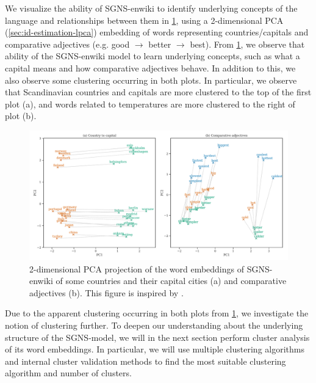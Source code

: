 We visualize the ability of SGNS-enwiki to identify underlying concepts of the language and relationships between them in \cref{fig:sgns-enwiki-word-to-word-relations-pca-2d}, using a 2-dimensional PCA (\cref{sec:id-estimation-lpca}) embedding of words representing countries/capitals and comparative adjectives (e.g. good $\rightarrow$ better $\rightarrow$ best). From \cref{fig:sgns-enwiki-word-to-word-relations-pca-2d}, we observe that ability of the SGNS-enwiki model to learn underlying concepts, such as what a capital means and how comparative adjectives behave. In addition to this, we also observe some clustering occurring in both plots. In particular, we observe that Scandinavian countries and capitals are more clustered to the top of the first plot (a), and words related to temperatures are more clustered to the right of plot (b).
\begin{figure}[H]
   \centering
   \includegraphics[width=\textwidth]{thesis/figures/word-to-word-relationships-pca-2d.pdf}
 \caption{2-dimensional PCA projection of the word embeddings of SGNS-enwiki of some countries and their capital cities (a) and comparative adjectives (b). This figure is inspired by \cite[Figure 2]{mikolov2013b}.}
 \label{fig:sgns-enwiki-word-to-word-relations-pca-2d}
\end{figure}

Due to the apparent clustering occurring in both plots from \cref{fig:sgns-enwiki-word-to-word-relations-pca-2d}, we investigate the notion of clustering further. To deepen our understanding about the underlying structure of the SGNS-model, we will in the next section perform cluster analysis of its word embeddings. In particular, we will use multiple clustering algorithms and internal cluster validation methods to find the most suitable clustering algorithm and number of clusters.